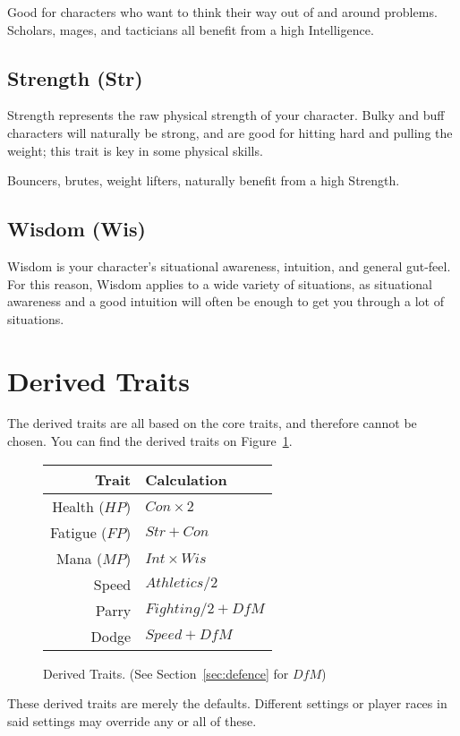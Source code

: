 Good for characters who want to think their way out of and around problems.
Scholars, mages, and tacticians all benefit from a high Intelligence.

\subsection{Strength (Str)}
Strength represents the raw physical strength of your character.
Bulky and buff characters will naturally be strong, and are good for hitting hard and pulling the weight; this trait is key in some physical skills.

Bouncers, brutes, weight lifters, naturally benefit from a high Strength.

\subsection{Wisdom (Wis)}
Wisdom is your character's situational awareness, intuition, and general gut-feel.
For this reason, Wisdom applies to a wide variety of situations, as situational awareness and a good intuition will often be enough to get you through a lot of situations.

\section{Derived Traits}
The derived traits are all based on the core traits, and therefore cannot be chosen. 
You can find the derived traits on Figure~\ref{fig:derived_traits}.

\begin{figure}[!ht]
    \centering
\begin{tabular}{r | l}
    \textbf{Trait} & \textbf{Calculation} \\\hline
    Health  ($HP$) & $Con\times 2$ \\
    Fatigue ($FP$) & $Str + Con$ \\
    Mana    ($MP$) & $Int\times Wis$ \\
    Speed          & $Athletics / 2$\\
    Parry          & $Fighting/2 + \mathit{DfM}$\\
    Dodge          & $Speed + \mathit{DfM}$
\end{tabular}
    \caption{Derived Traits. (See Section~\ref{sec:defence} for $\mathit{DfM}$)}
    \label{fig:derived_traits}
\end{figure}

\begin{note}
    These derived traits are merely the defaults. Different settings or player races in said settings may override any or all of these.
\end{note}

